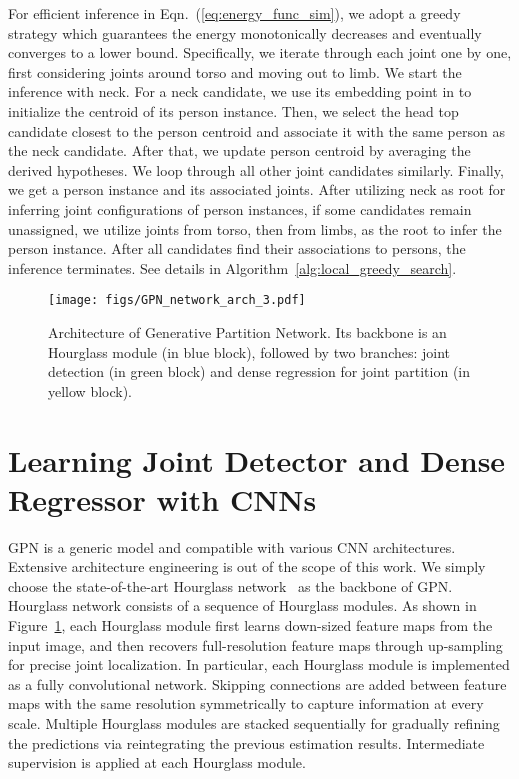 \documentclass[10pt,twocolumn,letterpaper]{article}
\begin{document}
For efficient inference in Eqn.~(\ref{eq:energy_func_sim}), we adopt a greedy strategy which guarantees the energy monotonically decreases and eventually converges to a lower bound.
Specifically, we iterate through each joint one by one, first considering joints around  torso and  moving out to  limb. We start the inference with  neck.
For a  neck candidate, we use its embedding point in   to initialize the  centroid of its person instance.
Then, we select the head top candidate closest to the person centroid and associate it with the same person as the neck candidate.
After that, we update  person centroid  by averaging the derived hypotheses. We loop through all other joint candidates  similarly.
Finally,  we get a person instance and its associated joints.  After utilizing neck as root for inferring joint configurations of person instances, if some candidates remain unassigned,
we utilize joints from torso, then from limbs, as the root to infer the person instance.  After all candidates find their associations to persons, the inference terminates. See details in Algorithm~\ref{alg:local_greedy_search}.

\begin{figure}[t!]
\begin{center}
\texttt{[image: figs/GPN\_network\_arch\_3.pdf]}
\caption{Architecture of Generative Partition Network.   Its backbone is an Hourglass module (in blue block), followed by two branches:  joint detection (in green block) and  dense regression for joint partition (in yellow block). }
\label{fig:gpn_network_arch}
\end{center}
\vspace{-20pt}
\end{figure}

\section{Learning Joint Detector and Dense Regressor with CNNs}



GPN is a generic model and compatible with various CNN architectures. Extensive  architecture engineering is out of the scope of this work.  We simply choose the state-of-the-art Hourglass network~\cite{hpe:hourglass_arxiv15} as the backbone of GPN. Hourglass network consists of a sequence of Hourglass modules. As shown in Figure~\ref{fig:gpn_network_arch}, each Hourglass module first learns down-sized   feature maps from the input image, and then recovers full-resolution feature maps through up-sampling for precise joint localization. In particular, each Hourglass module is implemented as a fully convolutional network. Skipping connections are added between feature maps with the same resolution symmetrically to capture information at every scale. Multiple Hourglass modules are stacked sequentially for gradually refining the predictions via reintegrating the previous estimation results. Intermediate supervision is applied at each Hourglass module.
\end{document}
